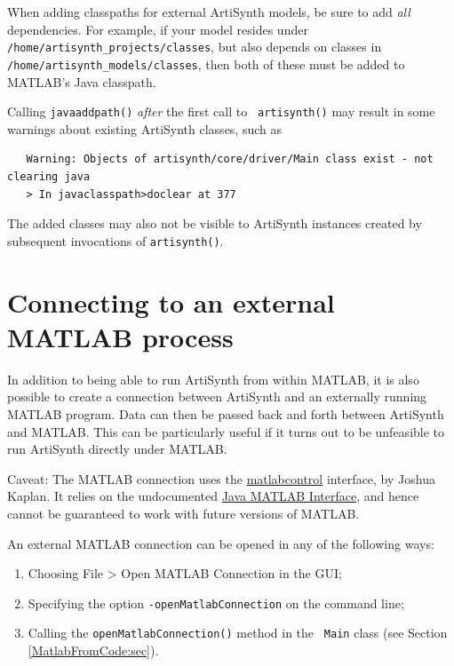 \documentclass{article}
\begin{document}
\begin{sideblock}
When adding classpaths for external ArtiSynth models, be sure to add
{\it all} dependencies. For example, if your model resides under {\tt
/home/artisynth\_projects/classes}, but also depends on classes in {\tt
/home/artisynth\_models/classes}, then both of these must be added to
MATLAB's Java classpath.
\end{sideblock}

\begin{sideblock}
Calling {\tt javaaddpath()}
{\it after} the first call to {\tt
artisynth()} may result in some warnings about existing
ArtiSynth classes, such as
\begin{verbatim}
   Warning: Objects of artisynth/core/driver/Main class exist - not clearing java 
   > In javaclasspath>doclear at 377
\end{verbatim}
The added classes may also not be visible to ArtiSynth instances
created by subsequent invocations of {\tt artisynth()}.
\end{sideblock}

\section{Connecting to an external MATLAB process}

In addition to being able to run ArtiSynth from within MATLAB, it is
also possible to create a connection between ArtiSynth and an
externally running MATLAB program. Data can then be passed back and
forth between ArtiSynth and MATLAB. This can be particularly useful if
it turns out to be unfeasible to run ArtiSynth directly under MATLAB.

\begin{sideblock}
Caveat: The MATLAB connection uses the
\href{https://code.google.com/p/matlabcontrol}{matlabcontrol}
interface, by Joshua Kaplan. It relies on the undocumented
\href{https://code.google.com/p/wiki/JMI}{Java MATLAB Interface}, and
hence cannot be guaranteed to work with future versions of MATLAB.
\end{sideblock}

An external MATLAB connection can be opened in any of the following
ways:

\begin{enumerate}

\item Choosing {\sf File > Open MATLAB Connection} in the GUI;

\item Specifying the option {\tt -openMatlabConnection} on
the command line;

\item Calling the {\tt openMatlabConnection()} method in the {\tt
Main} class (see Section \ref{MatlabFromCode:sec}).

\end{enumerate}
\end{document}
